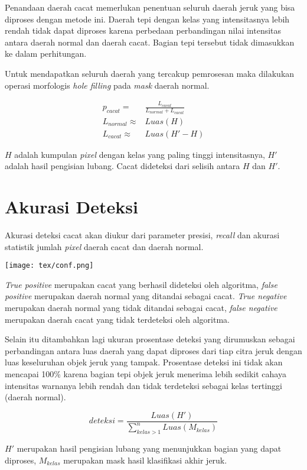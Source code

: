 \documentclass[laporan.tex]{subfiles}
\begin{document}
Penandaan daerah cacat memerlukan penentuan seluruh daerah jeruk yang bisa diproses dengan metode ini. Daerah tepi dengan kelas yang intensitasnya lebih rendah tidak dapat diproses karena perbedaan perbandingan nilai intensitas antara daerah normal dan daerah cacat. Bagian tepi tersebut tidak dimasukkan ke dalam perhitungan.

Untuk mendapatkan seluruh daerah yang tercakup pemrosesan maka dilakukan operasi morfologis \emph{hole filling} pada \emph{mask} daerah normal.

\begin{align}
	p_{cacat} = & \frac{L_{cacat}}{L_{normal} + L_{cacat}} \\
	L_{normal} \approx & Luas(H) \\
	L_{cacat} \approx & Luas(H' - H)
\end{align}

$H$ adalah kumpulan \emph{pixel} dengan kelas yang paling tinggi intensitasnya, $H'$ adalah hasil pengisian lubang. Cacat dideteksi dari selisih antara $H$ dan $H'$.

\section{Akurasi Deteksi}

Akurasi deteksi cacat akan diukur dari parameter presisi, \emph{recall} dan akurasi statistik jumlah \emph{pixel} daerah cacat dan daerah normal.

\texttt{[image: tex/conf.png]}

\emph{True positive} merupakan cacat yang berhasil dideteksi oleh algoritma, \emph{false positive} merupakan daerah normal yang ditandai sebagai cacat. \emph{True negative} merupakan daerah normal yang tidak ditandai sebagai cacat, \emph{false negative} merupakan daerah cacat yang tidak terdeteksi oleh algoritma.

Selain itu ditambahkan lagi ukuran prosentase deteksi yang dirumuskan sebagai perbandingan antara luas daerah yang dapat diproses dari tiap citra jeruk dengan luas keseluruhan objek jeruk yang tampak. Prosentase deteksi ini tidak akan mencapai 100\% karena bagian tepi objek jeruk menerima lebih sedikit cahaya intensitas warnanya lebih rendah dan tidak terdeteksi sebagai kelas tertinggi (daerah normal).

\begin{equation}
	deteksi = \frac{Luas(H')}{\sum_{kelas>1}^n Luas(M_{kelas})}
\end{equation}

$H'$ merupakan hasil pengisian lubang yang menunjukkan bagian yang dapat diproses, $M_{kelas}$ merupakan mask hasil klasifikasi akhir jeruk.
\end{document}
